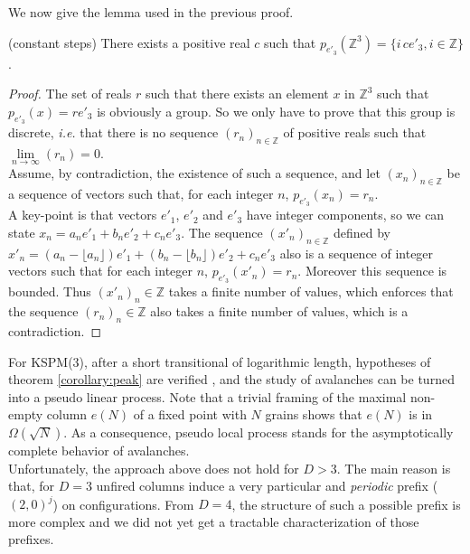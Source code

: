 \documentclass[11pt,a4paper]{llncs}
\begin{document}
We now give the lemma used in the previous proof. 

\begin{lemma}(constant steps)\label{lemma:alpha}
  There exists a  positive real $c$ such that $p_{e'_3}(\mathbb Z^3) = \{ i \, c  e'_3, i \in \mathbb Z \}$.
\end{lemma}

\begin{proof}
  The set  of reals $r$ such that there exists an element $x$ in $\mathbb Z^3$ such that  $p_{e'_3}(x)  = r e'_3$ is obviously a group. So we only have to prove that this group is discrete, {\em i.e.} that there is no sequence $(r_n)_{n \in  \mathbb Z}$ of positive reals such that $\lim \limits_{n \rightarrow \infty} (r_n)= 0$.\\
 Assume, by contradiction, the existence of such a sequence, and let  $(x_n)_{n \in  \mathbb Z}$ be a sequence of vectors such that, for each integer $n$, $p_{e'_3}(x_n) = r_n$. \\
 A key-point is that vectors $e'_1$, $e'_2$ and $e'_3$ have  integer  components, so we can state $x_n = a_n e'_1 + b_n e'_2 + c_n e'_3$. 
 The sequence  $(x'_n)_{n \in  \mathbb Z}$ defined by  $x'_n = (a_n -  \lfloor a_n \rfloor) e'_1 + (b_n -  \lfloor b_n \rfloor) e'_2 + c_n e'_3$ 
 also is a sequence of integer vectors such that for each integer $n$, $p_{e'_3}(x'_n) = r_n$. Moreover this sequence is bounded. Thus $(x'_n)_n \in  \mathbb Z$ takes a finite number of values, which enforces that the sequence $(r_n)_n \in  \mathbb Z$ also takes a finite number of values, which is a contradiction. 
\end{proof}

For KSPM(3), after a short transitional of logarithmic length,  hypotheses of theorem \ref{corollary:peak} are verified , and the study of avalanches can be turned into a pseudo linear process. Note that a trivial framing of the maximal non-empty column $e(N)$ of a fixed point with $N$ grains shows that $e(N)$ is in $\Omega(\sqrt{N})$. As a consequence, pseudo local process stands for the asymptotically complete behavior of avalanches.\\



Unfortunately, the approach above does not hold for $D >3$.  The main reason is that, for $D = 3$ unfired columns induce a very particular and \emph{periodic} prefix ($(2, 0)^j$) on configurations. From $D = 4$, the structure of such a possible prefix is more complex and we did not yet get a tractable characterization of those prefixes. 
\end{document}
